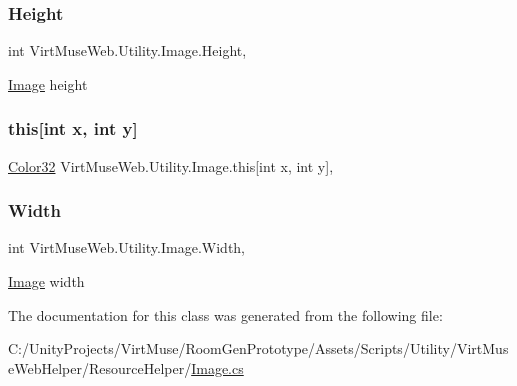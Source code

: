 \subsubsection{\texorpdfstring{Height}{Height}}
{\footnotesize\ttfamily int Virt\+Muse\+Web.\+Utility.\+Image.\+Height\hspace{0.3cm}{\ttfamily [get]}, {\ttfamily [set]}}



\mbox{\hyperlink{class_virt_muse_web_1_1_utility_1_1_image}{Image}} height 

\mbox{\label{class_virt_muse_web_1_1_utility_1_1_image_a05a3e3ec4ecba22e4338d2459127abb1}} 
\subsubsection{\texorpdfstring{this[int x, int y]}{this[int x, int y]}}
{\footnotesize\ttfamily \mbox{\hyperlink{struct_virt_muse_web_1_1_utility_1_1_image_1_1_color32}{Color32}} Virt\+Muse\+Web.\+Utility.\+Image.\+this\mbox{[}int x, int y\mbox{]}\hspace{0.3cm}{\ttfamily [get]}, {\ttfamily [set]}}

\mbox{\label{class_virt_muse_web_1_1_utility_1_1_image_aa60d34edebf73095308ca23c31a0024e}} 
\subsubsection{\texorpdfstring{Width}{Width}}
{\footnotesize\ttfamily int Virt\+Muse\+Web.\+Utility.\+Image.\+Width\hspace{0.3cm}{\ttfamily [get]}, {\ttfamily [set]}}



\mbox{\hyperlink{class_virt_muse_web_1_1_utility_1_1_image}{Image}} width 



The documentation for this class was generated from the following file\+:\begin{DoxyCompactItemize}
\item 
C\+:/\+Unity\+Projects/\+Virt\+Muse/\+Room\+Gen\+Prototype/\+Assets/\+Scripts/\+Utility/\+Virt\+Muse\+Web\+Helper/\+Resource\+Helper/\mbox{\hyperlink{_image_8cs}{Image.\+cs}}\end{DoxyCompactItemize}
